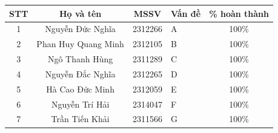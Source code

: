 \documentclass[a4paper, 15pt]{article}
\begin{document}

\begin{center}
\begin{table}[H]
\centering
\begin{tabularx}{\textwidth}{|c|c|c|X|c|}
\hline
\textbf{STT} & \textbf{Họ và tên} & \textbf{MSSV} & \textbf{Vấn đề} & \textbf{\% hoàn thành}\\
\hline 
\multirow{1}{*}{1} & \multirow{1}{*}{Nguyễn Đức Nghĩa} & \multirow{1}{*}{2312266} & A 
 & \multirow{1}{*}{100\%}\\
\hline 
\multirow{1}{*}{2} & \multirow{1}{*}{Phan Huy Quang Minh} & \multirow{1}{*}{2312105} & 
B & \multirow{1}{*}{100\%}\\

\hline
\multirow{1}{*}{3} & \multirow{1}{*}{Ngô Thanh Hùng} & \multirow{1}{*}{2311289} & 
C & \multirow{1}{*}{100\%}\\

\hline
\multirow{1}{*}{4} & \multirow{1}{*}{Nguyễn Đắc Nghĩa} & \multirow{1}{*}{2312265} & 
D & \multirow{1}{*}{100\%}\\
\hline
\multirow{1}{*}{5} & \multirow{1}{*}{Hà Cao Đức Minh} & \multirow{1}{*}{2312059} & 
E & \multirow{1}{*}{100\%}\\
\hline
\multirow{1}{*}{6} & \multirow{1}{*}{Nguyễn Trí Hải} & \multirow{1}{*}{2314047} & 
F & \multirow{1}{*}{100\%}\\
\hline
\multirow{1}{*}{7} & \multirow{1}{*}{Trần Tiến Khải} & \multirow{1}{*}{2311566} & 
G & \multirow{1}{*}{100\%}\\
\hline
\end{tabularx}
\end{table}
\end{center}

\newpage






\end{document}
